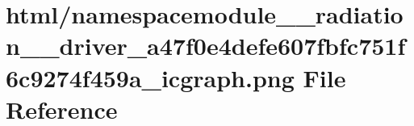 \hypertarget{namespacemodule____radiation____driver__a47f0e4defe607fbfc751f6c9274f459a__icgraph_8png}{}\section{html/namespacemodule\+\_\+\+\_\+radiation\+\_\+\+\_\+driver\+\_\+a47f0e4defe607fbfc751f6c9274f459a\+\_\+icgraph.png File Reference}
\label{namespacemodule____radiation____driver__a47f0e4defe607fbfc751f6c9274f459a__icgraph_8png}
